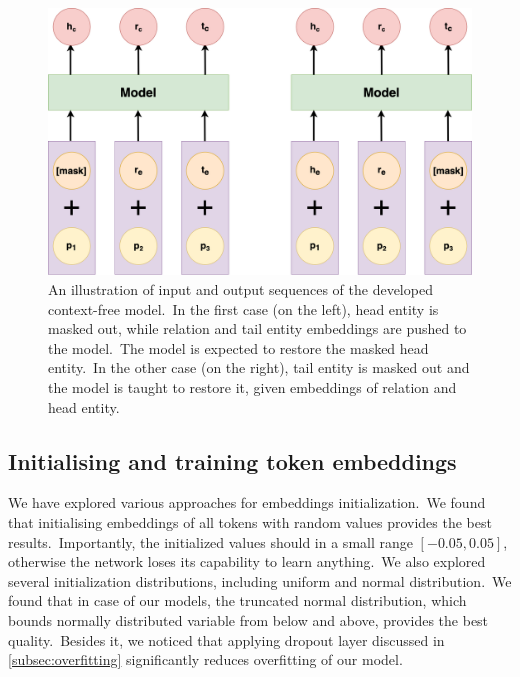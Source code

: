 \documentclass[longabstract, english, mgr]{iithesis}
\theoremstyle{default_theorem_style}\newtheorem{theorem}{Theorem}
\theoremstyle{default_theorem_style}\newtheorem{definition}{Definition}
\begin{document}
\begin{figure}[t]
\centering
\includegraphics[scale=0.25]{context_free_model}
\caption{An illustration of input and output sequences of the developed context-free model.\ In the first case
(on the left), head entity is masked out, while relation and tail entity embeddings are pushed to the model.\ The model
is expected to restore the masked head entity.\ In the other case (on the right), tail entity is masked out and the
model is taught to restore it, given embeddings of relation and head entity.}
\label{fig:context_free_model}
\end{figure}

\subsection{Initialising and training token embeddings}\label{subsec:token_embeddings}

We have explored various approaches for embeddings initialization.\ We found that initialising embeddings of
all tokens with random values provides the best results.\ Importantly, the initialized values should in a small range
$[-0.05, 0.05]$, otherwise the network loses its capability to learn anything.\ We also explored several
initialization distributions, including uniform and normal distribution.\ We found that in case of our models, the
truncated normal distribution, which bounds normally distributed variable from below and above, provides the best
quality.\ Besides it, we noticed that applying dropout layer discussed in \ref{subsec:overfitting} significantly
reduces overfitting of our model.\newline
\end{document}
